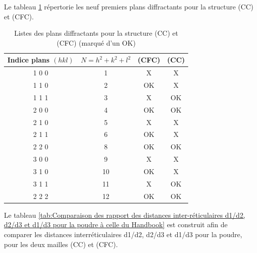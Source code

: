 \begin{flushleft}
\newpage
Le tableau \ref{tab:Listes des plans diffractants pour la structure (CC) et (CFC) (marqué d’un "OK")} répertorie les neuf premiers plans diffractants pour la structure (CC) et (CFC).
\begin{table}[h!]
	\centering
	\begin{tabular}{|c|c|c|c|}
		\hline
		\textbf{Indice plans $(h k l)$} & \textbf{$N=h^2+k^2+l^2$} & \textbf{(CFC)} & \textbf{(CC)} \\
		\hline
		1 0 0 & 1 & X & X \\
		\hline
		1 1 0 & 2 & \textcolor{myred}{OK} & X \\
		\hline
		1 1 1 & 3 & X & \textcolor{myred}{OK} \\
		\hline
		2 0 0 & 4 & \textcolor{myred}{OK } & \textcolor{myred}{OK} \\
		\hline
		2 1 0 & 5 & X & X \\
		\hline
		2 1 1 & 6 & \textcolor{myred}{OK } & X \\
		\hline
		2 2 0 & 8 & \textcolor{myred}{OK } & \textcolor{myred}{OK } \\
		\hline
		3 0 0 & 9 & X & X \\
		\hline
		3 1 0 & 10 & \textcolor{myred}{OK } & X \\
		\hline
		3 1 1 & 11 & X & \textcolor{myred}{OK } \\
		\hline
		2 2 2 & 12 & \textcolor{myred}{OK } & \textcolor{myred}{OK } \\
		\hline
	\end{tabular}
	\caption{Listes des plans diffractants pour la structure (CC) et (CFC) (marqué d’un \textcolor{myred}{OK})}
	\label{tab:Listes des plans diffractants pour la structure (CC) et (CFC) (marqué d’un "OK")}
\end{table}


Le tableau \ref{tab:Comparaison des rapport des distances inter-réticulaires d1/d2, d2/d3 et d1/d3 pour la poudre à celle du Handbook} est construit afin de comparer les distances interréticulaires
	d1/d2, d2/d3 et d1/d3 pour la poudre, pour les deux mailles (CC) et (CFC).


\end{flushleft}
